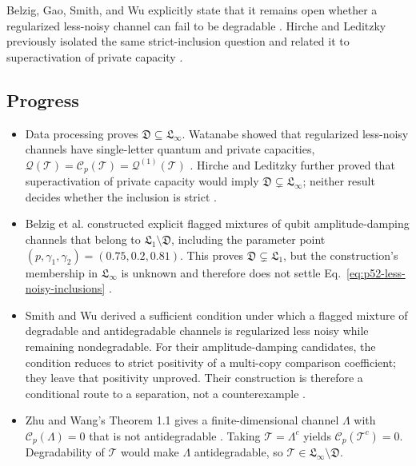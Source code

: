 Belzig, Gao, Smith, and Wu explicitly state that it remains open whether a
regularized less-noisy channel can fail to be degradable
.  Hirche and Leditzky previously
isolated the same strict-inclusion question and related it to superactivation
of private capacity .

\subsection*{Progress}

\begin{itemize}
  \item Data processing proves
  $\mathfrak D\subseteq\mathfrak L_\infty$.  Watanabe showed that regularized
  less-noisy channels have single-letter quantum and private capacities,
  $\mathcal Q(\mathcal T)=\mathcal C_p(\mathcal T)
  =\mathcal Q^{(1)}(\mathcal T)$
  .  Hirche and Leditzky further proved
  that superactivation of private capacity would imply
  $\mathfrak D\subsetneq\mathfrak L_\infty$; neither result decides whether
  the inclusion is strict .

  \item Belzig et al. constructed explicit flagged mixtures of qubit
  amplitude-damping channels that belong to
  $\mathfrak L_1\setminus\mathfrak D$, including the parameter point
  $(p,\gamma_1,\gamma_2)=(0.75,0.2,0.81)$.  This proves
  $\mathfrak D\subsetneq\mathfrak L_1$, but the construction's membership in
  $\mathfrak L_\infty$ is unknown and therefore does not settle
  Eq.~\eqref{eq:p52-less-noisy-inclusions}
  .

  \item Smith and Wu derived a sufficient condition under which a flagged
  mixture of degradable and antidegradable channels is regularized less noisy
  while remaining nondegradable.  For their amplitude-damping candidates, the
  condition reduces to strict positivity of a multi-copy comparison
  coefficient; they leave that positivity unproved.  Their construction is
  therefore a conditional route to a separation, not a counterexample
  .

  \item Zhu and Wang's Theorem 1.1 gives a finite-dimensional channel $\Lambda$ with $\mathcal C_p(\Lambda)=0$ that is not antidegradable . Taking $\mathcal T=\Lambda^c$ yields $\mathcal C_p(\mathcal T^c)=0$. Degradability of $\mathcal T$ would make $\Lambda$ antidegradable, so $\mathcal T\in\mathfrak L_\infty\setminus\mathfrak D$.
\end{itemize}


